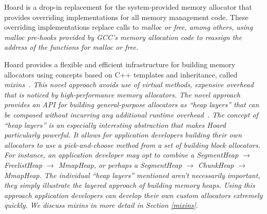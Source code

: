 \documentclass[9pt]{sig-alternate-10pt}
\begin{document}
Hoard is a drop-in replacement for the system-provided memory allocator that provides overriding implementations for all memory management code.  These overriding implementations replace calls to \em malloc \em or \em free\em, among others, using malloc pre-hooks provided by GCC's memory allocation code to reassign the address of the functions for \em malloc \em or \em free\em.

Hoard provides a flexible and efficient infrastructure for building memory allocators using concepts based on C++ templates and inheritance, called \em mixins\em~\cite{heaplayers}.  This novel approach avoids use of \em virtual \em methods, expensive overhead that is noticed by high-performance memory allocators.  The novel approach provides an API for building general-purpose allocators as ``heap layers'' that can be composed without incurring any additional runtime overhead~\cite{heaplayers}.  The concept of ``heap layers'' is an especially interesting abstraction that makes Hoard particularly powerful.  It allows for application developers building their own allocators to use a pick-and-choose method from a set of building block allocators.  For instance, an application developer may opt to combine a SegmentHeap $\rightarrow$ FreelistHeap $\rightarrow$ MmapHeap, or perhaps a SegmentHeap $\rightarrow$ ChunkHeap $\rightarrow$ MmapHeap.  The individual ``heap layers'' mentioned aren't necessarily important, they simply illustrate the layered approach of building memory heaps.  Using this approach application developers can develop their own custom allocators extremely quickly.  We discuss \em mixins \em in more detail in Section \ref{mixins}.
\end{document}
